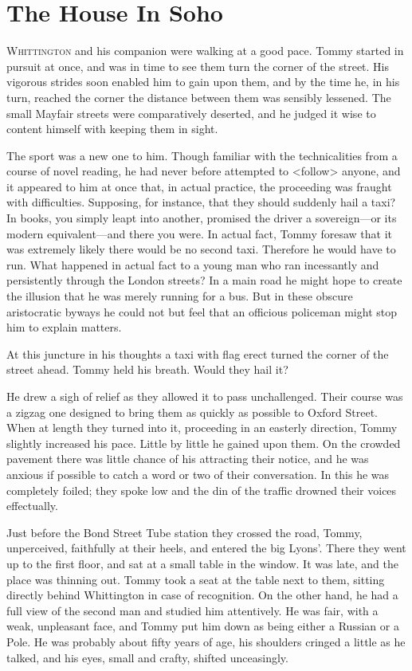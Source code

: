 \chapter{The House In Soho} 

 \lettrine{W}{hittington} and his companion were walking at a good pace. Tommy started in pursuit at once, and was in time to see them turn the corner of the street. His vigorous strides soon enabled him to gain upon them, and by the time he, in his turn, reached the corner the distance between them was sensibly lessened. The small Mayfair streets were comparatively deserted, and he judged it wise to content himself with keeping them in sight.

The sport was a new one to him. Though familiar with the technicalities from a course of novel reading, he had never before attempted to <follow> anyone, and it appeared to him at once that, in actual practice, the proceeding was fraught with difficulties. Supposing, for instance, that they should suddenly hail a taxi? In books, you simply leapt into another, promised the driver a sovereign—or its modern equivalent—and there you were. In actual fact, Tommy foresaw that it was extremely likely there would be no second taxi. Therefore he would have to run. What happened in actual fact to a young man who ran incessantly and persistently through the London streets? In a main road he might hope to create the illusion that he was merely running for a bus. But in these obscure aristocratic byways he could not but feel that an officious policeman might stop him to explain matters.

At this juncture in his thoughts a taxi with flag erect turned the corner of the street ahead. Tommy held his breath. Would they hail it?

He drew a sigh of relief as they allowed it to pass unchallenged. Their course was a zigzag one designed to bring them as quickly as possible to Oxford Street. When at length they turned into it, proceeding in an easterly direction, Tommy slightly increased his pace. Little by little he gained upon them. On the crowded pavement there was little chance of his attracting their notice, and he was anxious if possible to catch a word or two of their conversation. In this he was completely foiled; they spoke low and the din of the traffic drowned their voices effectually.

Just before the Bond Street Tube station they crossed the road, Tommy, unperceived, faithfully at their heels, and entered the big Lyons'. There they went up to the first floor, and sat at a small table in the window. It was late, and the place was thinning out. Tommy took a seat at the table next to them, sitting directly behind Whittington in case of recognition. On the other hand, he had a full view of the second man and studied him attentively. He was fair, with a weak, unpleasant face, and Tommy put him down as being either a Russian or a Pole. He was probably about fifty years of age, his shoulders cringed a little as he talked, and his eyes, small and crafty, shifted unceasingly.

